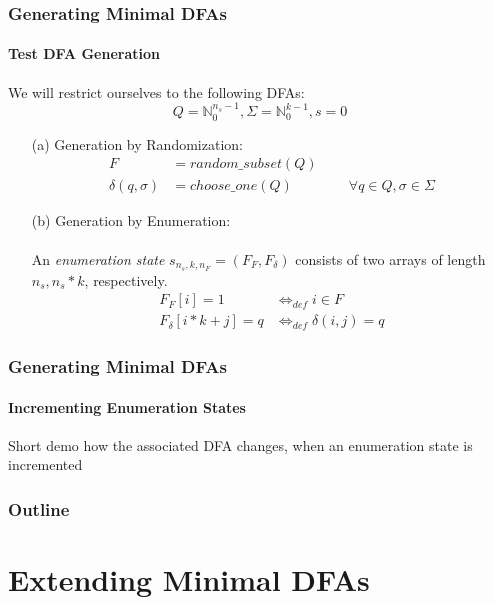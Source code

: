 \documentclass[handout,10pt]{beamer}%
\newcommand{\nSO}{{n_s}}
\newcommand{\nF}{{n_F}}
\newcommand{\kAL}{k}
\begin{document}
	\begin{frame}
		\frametitle{Generating Minimal DFAs}
		\framesubtitle{Test DFA Generation}
		We will restrict ourselves to the following DFAs:
		\[
			Q = \mathbb{N}_0^ {\nSO-1}, \Sigma = \mathbb{N}_0^{\kAL-1}, s = 0
		\]
		
		\begin{enumerate}
			\item[(a)] Generation by Randomization:
			\begin{align*}
			F &= random\_subset(Q)\\
			\delta(q, \sigma) &= choose\_one(Q) \qquad\qquad \forall q\in Q, \sigma\in\Sigma
			\end{align*}
			
			\item[(b)] Generation by Enumeration:\\$ $\\
			An \emph{enumeration state} $s_{\nSO, \kAL, \nF} = (F_F,F_\delta)$ consists of two arrays of length $\nSO, \nSO*\kAL$, respectively.
			\begin{align*}
			F_F[i] = 1 &\Leftrightarrow_{def} i \in F\\
			F_\delta[i * \kAL + j] = q &\Leftrightarrow_{def} \delta(i, j) = q
			\end{align*}
		\end{enumerate}
	
	\end{frame}

	\begin{frame}
		\frametitle{Generating Minimal DFAs}
		\framesubtitle{Incrementing Enumeration States}
		Short demo how the associated DFA changes, when an enumeration state is incremented
	
	\end{frame}
	
	
	\begin{frame}
		\frametitle{Outline}
		\tableofcontents %
	\end{frame}
	
	\section{Extending Minimal DFAs}
\end{document}
